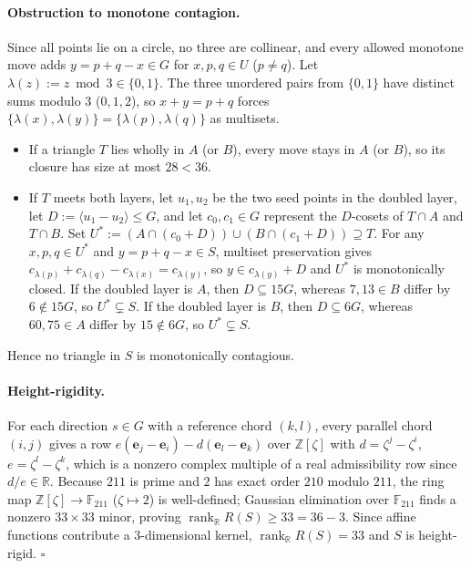 \documentclass[11pt]{article}
\begin{document}
\paragraph{Obstruction to monotone contagion.}
Since all points lie on a circle, no three are collinear, and every allowed monotone move adds $y = p + q - x \in G$ for $x, p, q \in U$ ($p \neq q$). Let $\lambda(z) := z \bmod 3 \in \{0, 1\}$. The three unordered pairs from $\{0, 1\}$ have distinct sums modulo $3$ ($0, 1, 2$), so $x + y = p + q$ forces $\{\lambda(x), \lambda(y)\} = \{\lambda(p), \lambda(q)\}$ as multisets.
\begin{itemize}
\item If a triangle $T$ lies wholly in $A$ (or $B$), every move stays in $A$ (or $B$), so its closure has size at most $28 < 36$.
\item If $T$ meets both layers, let $u_1, u_2$ be the two seed points in the doubled layer, let $D := \langle u_1 - u_2 \rangle \le G$, and let $c_0, c_1 \in G$ represent the $D$-cosets of $T \cap A$ and $T \cap B$. Set $U^* := (A \cap (c_0 + D)) \cup (B \cap (c_1 + D)) \supseteq T$. For any $x, p, q \in U^*$ and $y = p + q - x \in S$, multiset preservation gives $c_{\lambda(p)} + c_{\lambda(q)} - c_{\lambda(x)} = c_{\lambda(y)}$, so $y \in c_{\lambda(y)} + D$ and $U^*$ is monotonically closed. If the doubled layer is $A$, then $D \subseteq 15G$, whereas $7, 13 \in B$ differ by $6 \notin 15G$, so $U^* \subsetneq S$. If the doubled layer is $B$, then $D \subseteq 6G$, whereas $60, 75 \in A$ differ by $15 \notin 6G$, so $U^* \subsetneq S$.
\end{itemize}
Hence no triangle in $S$ is monotonically contagious.

\paragraph{Height-rigidity.}
For each direction $s \in G$ with a reference chord $(k, l)$, every parallel chord $(i, j)$ gives a row $e(\mathbf{e}_j - \mathbf{e}_i) - d(\mathbf{e}_l - \mathbf{e}_k)$ over $\mathbb{Z}[\zeta]$ with $d = \zeta^j - \zeta^i$, $e = \zeta^l - \zeta^k$, which is a nonzero complex multiple of a real admissibility row since $d/e \in \mathbb{R}$. Because $211$ is prime and $2$ has exact order $210$ modulo $211$, the ring map $\mathbb{Z}[\zeta] \to \mathbb{F}_{211}$ ($\zeta \mapsto 2$) is well-defined; Gaussian elimination over $\mathbb{F}_{211}$ finds a nonzero $33 \times 33$ minor, proving $\operatorname{rank}_{\mathbb{R}} R(S) \ge 33 = 36 - 3$. Since affine functions contribute a $3$-dimensional kernel, $\operatorname{rank}_{\mathbb{R}} R(S) = 33$ and $S$ is height-rigid. \hfill$\square$
\end{document}
